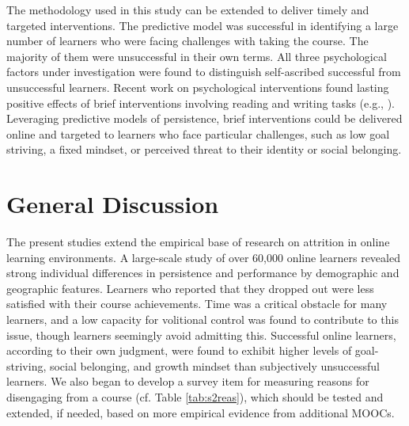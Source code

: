 \documentclass{sigchi}\usepackage[]{graphicx}\usepackage[]{color}
\begin{document}
The methodology used in this study can be extended to deliver timely and targeted interventions. The predictive model was successful in identifying a large number of learners who were facing challenges with taking the course. The majority of them were unsuccessful in their own terms. All three psychological factors under investigation were found to distinguish self-ascribed successful from unsuccessful learners. Recent work on psychological interventions found lasting positive effects of brief interventions involving reading and writing tasks (e.g., \cite{walton2007question}). Leveraging predictive models of persistence, brief interventions could be delivered online and targeted to learners who face particular challenges, such as low goal striving, a fixed mindset, or perceived threat to their identity or social belonging. 

\section{General Discussion}

The present studies extend the empirical base of research on attrition in online learning environments. A large-scale study of over 60,000 online learners revealed strong individual differences in persistence and performance by demographic and geographic features. Learners who reported that they dropped out were less satisfied with their course achievements. Time was a critical obstacle for many learners, and a low capacity for volitional control was found to contribute to this issue, though learners seemingly avoid admitting this. Successful online learners, according to their own judgment, were found to exhibit higher levels of goal-striving, social belonging, and growth mindset than subjectively unsuccessful learners. We also began to develop a survey item for measuring reasons for disengaging from a course (cf. Table \ref{tab:s2reas}), which should be tested and extended, if needed, based on more empirical evidence from additional MOOCs.
\end{document}
